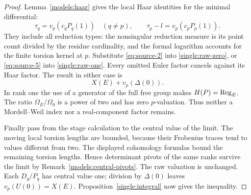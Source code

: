 \begin{proof}
Lemma~\ref{models:haar} gives the local Haar identities for
the minimal differential:
\[
 \tau_q=v_p(c_qP_q(1))\quad(q\ne p),\qquad
 \tau_p-l=v_p(c_pP_p(1)).
\]
They include all reduction types: the nonsingular reduction
measure is its point count divided by the residue cardinality,
and the formal logarithm accounts for the finite torsion kernel
at \(p\).  Substitute \eqref{eq:source-2} into
\eqref{single:raw-zero}, or \eqref{eq:source-5} into
\eqref{single:raw-one}.  Every omitted Euler factor cancels
against its Haar factor.  The result in either case is
\[
                         X(E)+v_p(\Delta(0)).
\]
In rank one the use of a generator of the full free group makes
\(H(P)=\operatorname{Reg}_E\).  The ratio \(\Omega_E/\Omega_0\) is a
power of two and has zero \(p\)-valuation.  Thus neither a
Mordell--Weil index nor a real-component factor remains.

Finally pass from the stage calculation to the central value
of the limit.  The moving local torsion lengths are bounded,
because their Frobenius traces tend to values different from
two.  The displayed cohomology formulas bound the remaining
torsion lengths.  Hence determinant pivots of the same ranks
survive the limit by Remark~\ref{models:central-pivots}.
The raw valuation is unchanged.
Each \(D_q/P_q\) has central value one; division by
\(\Delta(0)\) leaves \(v_p(U(0))=X(E)\).
Proposition~\ref{single:integral} now gives the inequality.
\end{proof}
